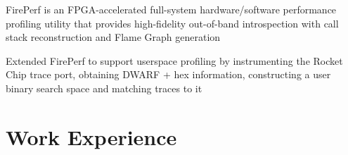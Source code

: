 \documentclass[]{deedy-resume-openfont}
\begin{document}
\begin{minipage}[t]{0.64\textwidth}

\begin{tightemize}
{\normalsize
\item FirePerf is an FPGA-accelerated full-system hardware/software performance profiling utility that provides high-fidelity out-of-band introspection with call stack reconstruction and Flame Graph generation
\item Extended FirePerf to support userspace profiling by instrumenting the Rocket Chip trace port, obtaining DWARF + hex information, constructing a user binary search space and matching traces to it
}
\end{tightemize}




\section{Work Experience}


\end{minipage}
\end{document}
